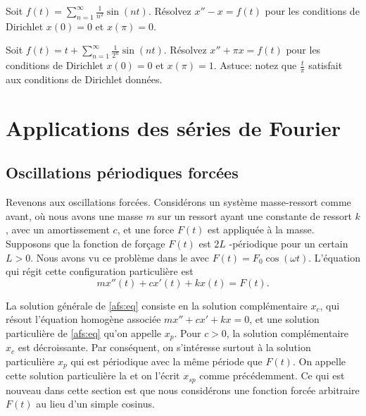 \begin{exercise}
Soit $f(t) = \sum_{n=1}^\infty \frac{1}{n^2} \sin(nt)$.  Résolvez
$x''- x = f(t)$ pour les conditions de Dirichlet $x(0) = 0$
et $x(\pi) = 0$.
\end{exercise}

\begin{exercise}[défi]
Soit $f(t) = t + \sum_{n=1}^\infty \frac{1}{2^n} \sin(nt)$.  Résolvez
$x'' + \pi x = f(t)$ pour les conditions de Dirichlet $x(0) = 0$
et $x(\pi) = 1$.  Astuce:  notez que $\frac{t}{\pi}$ satisfait aux conditions de Dirichlet données.
\end{exercise}



\sectionnewpage
\section{Applications des séries de Fourier}
\label{appoffourier:section}


\subsection{Oscillations périodiques forcées}

\begin{mywrapfigsimp}{2.0in}{2.3in}
\noindent
{}
\end{mywrapfigsimp}
Revenons aux oscillations forcées. Considérons un système masse-ressort comme
avant, où nous avons une masse $ m $
sur un ressort ayant une constante de ressort $ k $,
avec un amortissement $ c $, et une force $ F (t) $ est appliquée à la masse. Supposons que
la fonction de forçage $ F (t) $ est $ 2L $ -périodique pour un certain $ L> 0 $.
Nous avons vu
ce problème dans le  avec $ F (t) = F_0 \cos (\omega t) $. L'équation qui régit cette configuration particulière est
\begin{equation} \label{afs:eq}
mx''(t) + cx'(t) + kx(t) = F(t) .
\end{equation}

La solution générale de \eqref{afs:eq} consiste en la solution complémentaire $ x_c $, qui
résout l'équation homogène associée $ mx '' + cx '+ kx = 0 $, et
une solution particulière de \eqref{afs:eq} qu'on appelle $ x_p $. Pour $ c> 0 $,
la solution complémentaire $ x_c $ est décroissante.
Par conséquent, on s'intéresse surtout à la solution particulière $ x_p $ qui est périodique avec la même période que $ F (t) $. On appelle cette solution particulière la
\emph{} et on l'écrit  $ x_ {sp} $ comme précédemment.
Ce qui est nouveau dans cette section est que nous considérons une fonction forcée arbitraire $ F (t) $ au lieu d'un simple cosinus.


